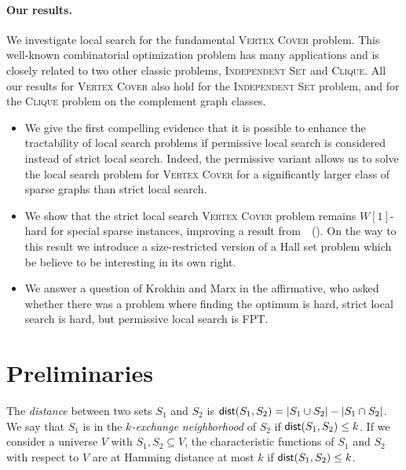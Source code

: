 \documentclass[10pt,usletter]{article}
\newcommand{\dist}{{\normalfont \textsf{dist}}}
\newcommand{\citex}[1]{\citeauthor{#1}~(\citeyear{#1})}
\begin{document}
\paragraph{Our results.}
We investigate local search for the fundamental \textsc{Vertex Cover}
problem. This well-known combinatorial optimization problem
has many applications \citep{AbuKhzamCFLSS04,GomesMPV06}
and is closely related to two other classic problems,
\textsc{Independent Set} and \textsc{Clique}.
All our results for \textsc{Vertex Cover} also hold for
the \textsc{Independent Set} problem, and for the \textsc{Clique} problem on
the complement graph classes.
\begin{itemize}
\item We give the first compelling evidence that it is possible to
  enhance the tractability of local search problems if permissive local search is considered instead of strict local search.
  Indeed, the
  permissive variant allows us to solve the local search problem for
  \textsc{Vertex Cover}
  for a significantly larger class of sparse graphs than strict local
  search. \item We show that the strict local search \textsc{Vertex Cover} problem
  remains $W[1]$-hard for special sparse instances, improving a result
  from~\citex{FellowsRosamondFominLokshtanovSaurabhVillanger09}. On the
  way to this result we introduce a size-restricted version of a Hall
  set problem which be believe to be interesting in its own right.
\item We answer a question of Krokhin and Marx in the affirmative, who
  asked whether there was a problem where finding the optimum is hard, 
  strict local search is hard, but permissive local search is FPT.
\end{itemize}

\section{Preliminaries}
The \emph{distance} between two sets $S_1$ and $S_2$
is $\dist(S_1,S_2)=|S_1\cup S_2| - |S_1 \cap S_2|$.
We say that $S_1$ is in the \emph{$k$-exchange neighborhood} of $S_2$
if $\dist(S_1,S_2)\le k$.
If we consider a universe $V$ with $S_1,S_2\subseteq V$, the characteristic
functions of $S_1$ and $S_2$ with respect to $V$ are at Hamming distance
at most $k$ if $\dist(S_1,S_2)\le k$.
\end{document}
